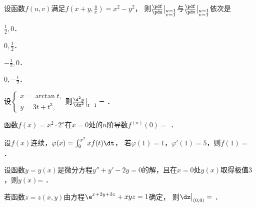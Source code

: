\documentclass[plain,noanswer,medmath]{../../template/jnuexam}
\begin{document}
\begin{problem}
设函数$f\left(u,v \right)$满足$f\left(x + y,\frac{y}{x}\right) = x^2 - y^2$，
则$\frac{\pdf}{\pdu}\big|_{\begin{subarray}{l}
  u = 1 \\
  v = 1
\end{subarray}}$与$\frac{\pdf}{\pdv}\big|_{\begin{subarray}{l}
  u = 1 \\
  v = 1
\end{subarray}}$依次是\pickout{}
\begin{abcd}
\item $\frac{1}{2},0$．
\item $0,\frac{1}{2}$．
\item $- \frac{1}{2},0$．
\item $0, - \frac{1}{2}$．
\end{abcd}
\end{problem}










\begin{problem}
设$\begin{cases}
  x = \arctan t, \\
  y = 3t + t^3,
\end{cases}$则$\frac{\d^2y}{\dx^2}\big|_{t = 1} =$ \fillin{}．
\end{problem}


\begin{problem}
函数$f(x) = x^2 \cdot 2^x$在$x = 0$处的$n$阶导数$f^{(n)}(0) =$ \fillin{}．
\end{problem}


\begin{problem}
设$f(x)$连续，$\varphi (x) = \int_0^{x^2} x f(t)\dt$，
若$\varphi (1) = 1$，$\varphi'(1) = 5$，则$f(1) =$ \fillin{}．
\end{problem}


\begin{problem}
设函数$y = y(x)$是微分方程$y'' + y' - 2y = 0$的解，且在$x = 0$处$y(x)$取得极值$3$，则$y(x)$= \fillin{}．
\end{problem}


\begin{problem}
若函数$z = z(x,y)$由方程$\e^{x + 2y + 3z} + xyz = 1$确定，
则$\dz\big|_{(0,0)} =$ \fillin{}．
\end{problem}
\end{document}
